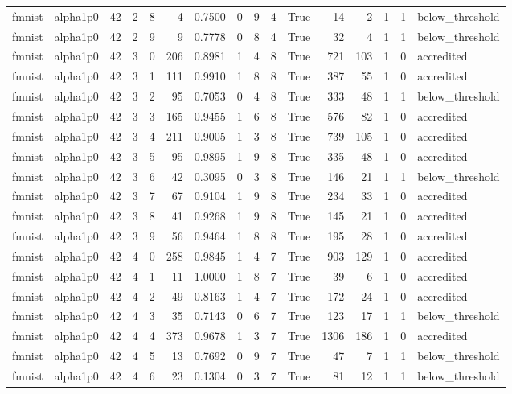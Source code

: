 \begin{tabular}{llrrrrrrrrrrrrrl}
fmnist & alpha1p0 & 42 & 2 & 8 & 4 & 0.7500 & 0 & 9 & 4 & True & 14 & 2 & 1 & 1 & below\_threshold \\
fmnist & alpha1p0 & 42 & 2 & 9 & 9 & 0.7778 & 0 & 8 & 4 & True & 32 & 4 & 1 & 1 & below\_threshold \\
fmnist & alpha1p0 & 42 & 3 & 0 & 206 & 0.8981 & 1 & 4 & 8 & True & 721 & 103 & 1 & 0 & accredited \\
fmnist & alpha1p0 & 42 & 3 & 1 & 111 & 0.9910 & 1 & 8 & 8 & True & 387 & 55 & 1 & 0 & accredited \\
fmnist & alpha1p0 & 42 & 3 & 2 & 95 & 0.7053 & 0 & 4 & 8 & True & 333 & 48 & 1 & 1 & below\_threshold \\
fmnist & alpha1p0 & 42 & 3 & 3 & 165 & 0.9455 & 1 & 6 & 8 & True & 576 & 82 & 1 & 0 & accredited \\
fmnist & alpha1p0 & 42 & 3 & 4 & 211 & 0.9005 & 1 & 3 & 8 & True & 739 & 105 & 1 & 0 & accredited \\
fmnist & alpha1p0 & 42 & 3 & 5 & 95 & 0.9895 & 1 & 9 & 8 & True & 335 & 48 & 1 & 0 & accredited \\
fmnist & alpha1p0 & 42 & 3 & 6 & 42 & 0.3095 & 0 & 3 & 8 & True & 146 & 21 & 1 & 1 & below\_threshold \\
fmnist & alpha1p0 & 42 & 3 & 7 & 67 & 0.9104 & 1 & 9 & 8 & True & 234 & 33 & 1 & 0 & accredited \\
fmnist & alpha1p0 & 42 & 3 & 8 & 41 & 0.9268 & 1 & 9 & 8 & True & 145 & 21 & 1 & 0 & accredited \\
fmnist & alpha1p0 & 42 & 3 & 9 & 56 & 0.9464 & 1 & 8 & 8 & True & 195 & 28 & 1 & 0 & accredited \\
fmnist & alpha1p0 & 42 & 4 & 0 & 258 & 0.9845 & 1 & 4 & 7 & True & 903 & 129 & 1 & 0 & accredited \\
fmnist & alpha1p0 & 42 & 4 & 1 & 11 & 1.0000 & 1 & 8 & 7 & True & 39 & 6 & 1 & 0 & accredited \\
fmnist & alpha1p0 & 42 & 4 & 2 & 49 & 0.8163 & 1 & 4 & 7 & True & 172 & 24 & 1 & 0 & accredited \\
fmnist & alpha1p0 & 42 & 4 & 3 & 35 & 0.7143 & 0 & 6 & 7 & True & 123 & 17 & 1 & 1 & below\_threshold \\
fmnist & alpha1p0 & 42 & 4 & 4 & 373 & 0.9678 & 1 & 3 & 7 & True & 1306 & 186 & 1 & 0 & accredited \\
fmnist & alpha1p0 & 42 & 4 & 5 & 13 & 0.7692 & 0 & 9 & 7 & True & 47 & 7 & 1 & 1 & below\_threshold \\
fmnist & alpha1p0 & 42 & 4 & 6 & 23 & 0.1304 & 0 & 3 & 7 & True & 81 & 12 & 1 & 1 & below\_threshold \\

\end{tabular}
